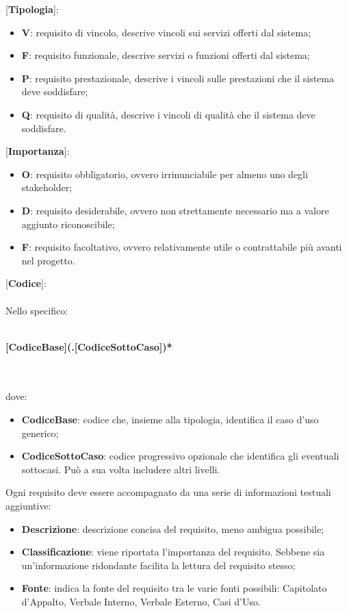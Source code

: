 [\textbf{Tipologia}]:
\begin{itemize}
    \item \textbf{V}: requisito di vincolo, descrive vincoli sui servizi offerti dal sistema;
    \item \textbf{F}: requisito funzionale, descrive servizi o funzioni offerti dal sistema;
    \item \textbf{P}: requisito prestazionale, descrive i vincoli sulle prestazioni che il sistema deve soddisfare;
    \item \textbf{Q}: requisito di qualità, descrive i vincoli di qualità che il sistema deve soddisfare.
\end{itemize}
[\textbf{Importanza}]:
\begin{itemize}
    \item \textbf{O}: requisito obbligatorio, ovvero irrinunciabile per almeno uno degli stakeholder;
    \item \textbf{D}: requisito desiderabile, ovvero non strettamente necessario ma a valore aggiunto riconoscibile;
    \item \textbf{F}: requisito facoltativo, ovvero relativamente utile o contrattabile più avanti nel progetto.
\end{itemize}
[\textbf{Codice}]:
\\\\Nello specifico:\\\\
\centerline{\textbf{[CodiceBase](.[CodiceSottoCaso])*}}
\\\\dove:
\begin{itemize}
    \item \textbf{CodiceBase}: codice che, insieme alla tipologia, identifica il caso d’uso generico;
    \item \textbf{CodiceSottoCaso}: codice progressivo opzionale che identifica gli eventuali sottocasi. Può a sua volta includere altri livelli.
\end{itemize}
Ogni requisito deve essere accompagnato da una serie di informazioni testuali aggiuntive:
\begin{itemize}
    \item \textbf{Descrizione}: descrizione concisa del requisito, meno ambigua possibile;
    \item \textbf{Classificazione}: viene riportata l’importanza del requisito. Sebbene sia un’informazione ridondante facilita la lettura del requisito stesso;
    \item \textbf{Fonte}: indica la fonte del requisito tra le varie fonti possibili: Capitolato d’Appalto, Verbale Interno, Verbale Esterno, Casi d’Uso.
\end{itemize}
